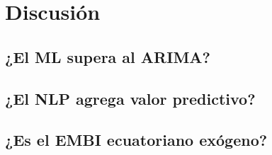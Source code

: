 \chapter{Discusión}

\section{¿El ML supera al ARIMA?}

\section{¿El NLP agrega valor predictivo?}

\section{¿Es el EMBI ecuatoriano exógeno?}

